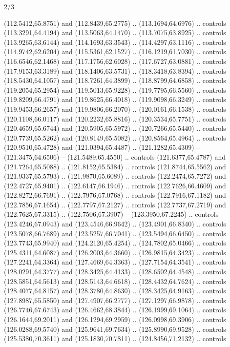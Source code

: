 \begin{flagdescription}{2/3}
\begin{scope}[shift={(0.5\flaglength,0.5)},scale=\flagwidth/320]
\begin{scope}[y=0.8pt, x=0.8pt, yscale=-1,shift={(-118.3,-146)}]
  (112.5412,65.8751) and (112.8439,65.2775) .. (113.1694,64.6976) .. controls
  (113.3291,64.4194) and (113.5063,64.1470) .. (113.7075,63.8925) .. controls
  (113.9265,63.6144) and (114.1693,63.3543) .. (114.4297,63.1116) .. controls
  (114.9742,62.6204) and (115.5361,62.1527) .. (116.1219,61.7030) .. controls
  (116.6546,62.1468) and (117.1756,62.6028) .. (117.6727,63.0881) .. controls
  (117.9153,63.3189) and (118.1406,63.5731) .. (118.3418,63.8394) .. controls
  (118.5430,64.1057) and (118.7261,64.3899) .. (118.8799,64.6858) .. controls
  (119.2054,65.2954) and (119.5013,65.9228) .. (119.7795,66.5560) .. controls
  (119.8209,66.4791) and (119.8625,66.4018) .. (119.9098,66.3249) .. controls
  (119.9453,66.2657) and (119.9806,66.2070) .. (120.0161,66.1538) .. controls
  (120.1108,66.0117) and (120.2232,65.8816) .. (120.3534,65.7751) .. controls
  (120.4659,65.6744) and (120.5905,65.5972) .. (120.7266,65.5440) .. controls
  (120.7739,65.5262) and (120.8149,65.5082) .. (120.8564,65.4964) .. controls
  (120.9510,65.4728) and (121.0394,65.4487) .. (121.1282,65.4309) --
  (121.3475,64.6506) -- (121.5489,65.4550) .. controls (121.6377,65.4787) and
  (121.7264,65.5088) .. (121.8152,65.5384) .. controls (121.8744,65.5562) and
  (121.9337,65.5793) .. (121.9870,65.6089) .. controls (122.2474,65.7272) and
  (122.4727,65.9401) .. (122.6147,66.1946) .. controls (122.7626,66.4609) and
  (122.8272,66.7691) .. (122.7976,67.0768) .. controls (122.7916,67.1182) and
  (122.7856,67.1654) .. (122.7797,67.2127) .. controls (122.7737,67.2719) and
  (122.7625,67.3315) .. (122.7506,67.3907) -- (123.3950,67.2245) .. controls
  (123.4246,67.0943) and (123.4546,66.9642) .. (123.4901,66.8340) .. controls
  (123.5078,66.7689) and (123.5257,66.7041) .. (123.5494,66.6450) .. controls
  (123.7743,65.9940) and (124.2120,65.4254) .. (124.7802,65.0466) .. controls
  (125.4311,64.6087) and (126.2003,64.3660) .. (126.9815,64.3423) .. controls
  (127.2241,64.3364) and (127.4669,64.3363) .. (127.7154,64.3541) .. controls
  (128.0291,64.3777) and (128.3425,64.4133) .. (128.6502,64.4548) .. controls
  (128.5851,64.5613) and (128.5143,64.6618) .. (128.4432,64.7624) .. controls
  (128.4077,64.8157) and (128.3780,64.8630) .. (128.3425,64.9163) .. controls
  (127.8987,65.5850) and (127.4907,66.2777) .. (127.1297,66.9878) .. controls
  (126.7746,67.6743) and (126.4662,68.3844) .. (126.1999,69.1064) .. controls
  (126.1644,69.2011) and (126.1294,69.2959) .. (126.0998,69.3906) .. controls
  (126.0288,69.5740) and (125.9641,69.7634) .. (125.8990,69.9528) .. controls
  (125.5380,70.3611) and (125.1830,70.7811) .. (124.8456,71.2132) .. controls

\end{scope}
\end{scope}
\end{flagdescription}
